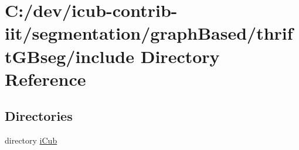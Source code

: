 \section{C\+:/dev/icub-\/contrib-\/iit/segmentation/graph\+Based/thrift\+G\+Bseg/include Directory Reference}
\label{dir_57c85e712734feea42b0ca8ed7ef603b}
\subsection*{Directories}
\begin{DoxyCompactItemize}
\item 
directory \hyperlink{dir_b2d575b068a897e576cb9bb696d4526f}{i\+Cub}
\end{DoxyCompactItemize}
